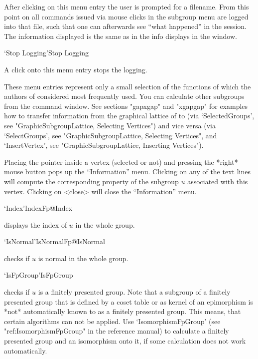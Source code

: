 After clicking on this menu entry the user is prompted for a filename. From 
this point on all commands issued via mouse clicks in the subgroup menu are 
logged into that file, such that one can afterwards see ``what happened''
in the {\XGAP} session. The information displayed is the same as in the
info displays in the {\GAP} window. 

\>`Stop Logging'{Stop Logging}

A click onto this menu entry stops the {\XGAP} logging.

\bigskip

These menu entries represent only a small selection of the functions of
{\GAP} which the authors of {\XGAP} considered most frequently used. You
can calculate other subgroups from
the {\GAP} command window. See sections "gapxgap" and
"xgapgap" for examples how to transfer information from the graphical
lattice of {\XGAP} to {\GAP} (via `SelectedGroups', see
"GraphicSubgroupLattice, Selecting Vertices") and vice versa (via
`SelectGroups', see "GraphicSubgroupLattice, Selecting Vertices", and
`InsertVertex', see "GraphicSubgroupLattice, Inserting Vertices").



Placing the pointer  inside a vertex (selected  or not) and  pressing the
*right* mouse button pops up the ``Information''  menu.  Clicking on any of
the text  lines will compute the corresponding   property of the subgroup
$u$  associated  with this  vertex. Clicking  on <close>  will  close the
``Information'' menu.

\>`Index'{IndexFp}@{Index}

displays  the index of  $u$ in the whole  group.

\>`IsNormal'{IsNormalFp}@{IsNormal}

checks  if $u$ is  normal  in the  whole group.

\>`IsFpGroup'{IsFpGroup}

checks if $u$ is a finitely presented group. Note that a subgroup of a
finitely presented group that is defined by a coset table or as kernel
of an epimorphism is *not* automatically known to {\GAP} as a finitely
presented group. This means, that certain algorithms can not be
applied. Use `IsomorphismFpGroup' (see "ref:IsomorphismFpGroup" in the
{\GAP} reference manual) to calculate a finitely presented group and
an isomorphism onto it, if some calculation does not work automatically.

